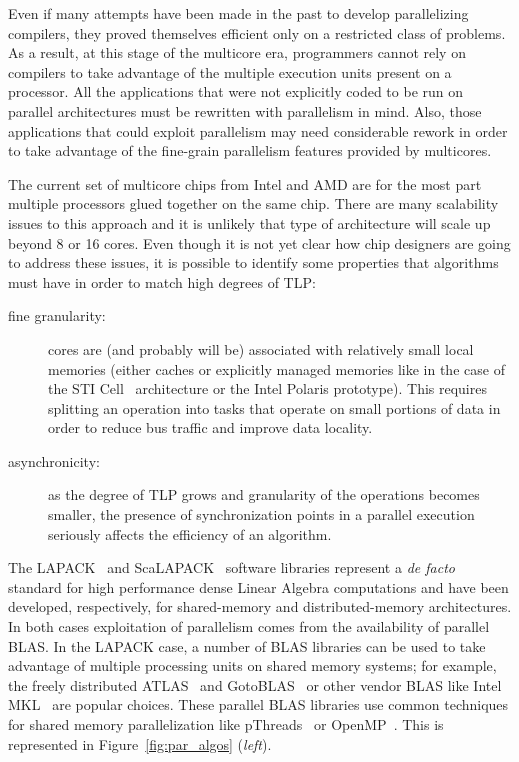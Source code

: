 \documentclass[runningheads]{llncs}
\begin{document}
Even if many attempts have been made in the past to develop
parallelizing compilers, they proved themselves efficient only on a
restricted class of problems. As a result, at this stage of the
multicore era, programmers cannot rely on compilers to take advantage
of the multiple execution units present on a processor. All the
applications that were not explicitly coded to be run on parallel
architectures must be rewritten with parallelism in mind. Also,
those applications that could exploit parallelism may need considerable
rework in order to take advantage of the fine-grain parallelism
features provided by multicores.

The current set of multicore chips from Intel and AMD are for the most
part multiple processors glued together on the same chip. There are
many scalability issues to this approach and it is unlikely that type
of architecture will scale up beyond 8 or 16 cores. Even though it is
not yet clear how chip designers are going to address these issues, it
is possible to identify some properties that algorithms must have in
order to match high degrees of TLP:

\begin{description}
\item[fine granularity:] cores are (and probably will be) associated
  with relatively small local memories (either caches or explicitly managed
  memories like in the case of the STI Cell~\cite{isscc_2005_cell_desing} architecture or the Intel
  Polaris\cite{polaris} prototype). This requires splitting an operation into tasks
  that operate on small portions of data in order to reduce bus
  traffic and improve data locality.
\item[asynchronicity:] as the degree of TLP grows and granularity of
  the operations becomes smaller, the presence of synchronization
  points in a parallel execution seriously affects the efficiency of
  an algorithm.
\end{description}


The LAPACK~\cite{lapack:99} and ScaLAPACK~\cite{scalapack:96} software
libraries represent a {\it de facto} standard for high performance
dense Linear Algebra computations and have been developed,
respectively, for shared-memory and distributed-memory
architectures. In both cases exploitation of parallelism comes from
the availability of parallel BLAS. In the LAPACK case, a number of
BLAS libraries can be used to take advantage of multiple processing
units on shared memory systems; for example, the freely distributed
ATLAS~\cite{ATLAS} and GotoBLAS~\cite{gotoblas} or other vendor BLAS
like Intel MKL~\cite{mkl} are popular choices. These parallel BLAS
libraries use common techniques for shared memory parallelization like
pThreads~\cite{mueller93pthreads} or OpenMP~\cite{10.1109/99.660313}.
This is represented in Figure~\ref{fig:par_algos} ({\it left}).
\end{document}
